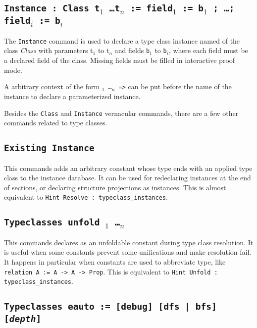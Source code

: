 \subsection{\tt Instance {\ident} : {Class} {t$_1$ \ldots t$_n$}
  := field$_1$ := b$_1$ ; \ldots ; field$_i$ := b$_i$}
\label{Instance}

The \texttt{Instance} command is used to declare a type class instance
named {\ident} of the class \emph{Class} with parameters {t$_1$} to {t$_n$} and
fields {\tt b$_1$} to {\tt b$_i$}, where each field must be a declared
field of the class. Missing fields must be filled in interactive proof mode.

A arbitrary context of the form {\tt \binder$_1$ \ldots \binder$_n$ =>}
can be put before the name of the instance to declare a parameterized instance.

Besides the {\tt Class} and {\tt Instance} vernacular commands, there
are a few other commands related to type classes.

\subsection{\tt Existing Instance {\ident}}
\label{ExistingInstance}

This commands adds an arbitrary constant whose type ends with an applied
type class to the instance database. It can be used for redeclaring
instances at the end of sections, or declaring structure projections as
instances. This is almost equivalent to {\tt Hint Resolve {\ident} :
  typeclass\_instances}.

\subsection{\tt Typeclasses unfold {\ident$_1$ \ldots \ident$_n$}}
\label{TypeclassesUnfold}

This commands declares {\ident} as an unfoldable constant during type
class resolution. It is useful when some constants prevent some
unifications and make resolution fail. It happens in particular when constants are
used to abbreviate type, like {\tt relation A := A -> A -> Prop}.
This is equivalent to {\tt Hint Unfold {\ident} : typeclass\_instances}.

\subsection{\tt Typeclasses eauto := [debug] [dfs | bfs] [\emph{depth}]}
\label{TypeclassesEauto}

